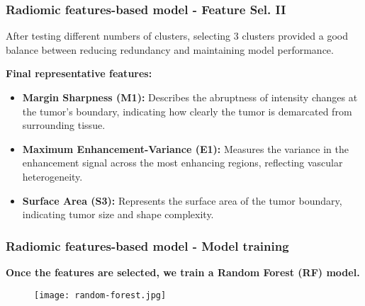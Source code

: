 
\begin{frame}
    \frametitle{Radiomic features-based model - Feature Sel.  II}
    \vspace{3mm}

       After testing different numbers of clusters, selecting 3 clusters provided a good balance between reducing redundancy and maintaining model performance.

                \vspace{3mm}

	\textbf{Final representative features:}
            \begin{itemize}
                \item \textbf{Margin Sharpness (M1):} Describes the abruptness of intensity changes at the tumor’s boundary, indicating how clearly the tumor is demarcated from surrounding tissue.
                \item \textbf{Maximum Enhancement-Variance (E1):} Measures the variance in the enhancement signal across the most enhancing regions, reflecting vascular heterogeneity.
                \item \textbf{Surface Area (S3):} Represents the surface area of the tumor boundary, indicating tumor size and shape complexity.
            \end{itemize}

    \vfill 
\end{frame}


\begin{frame}
    \frametitle{Radiomic features-based model - Model training}
    \vspace{3mm}
	
	\textbf{Once the features are selected, we train a Random Forest (RF) model.}
    \vspace{1mm}
    \begin{figure}[h]
        \centering
        \texttt{[image: random-forest.jpg]}
    \end{figure}

    \vfill 
\end{frame}


